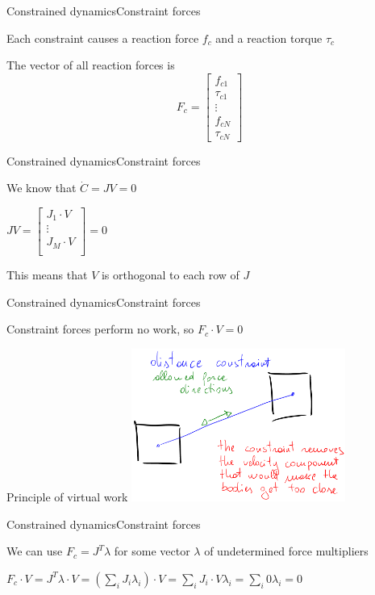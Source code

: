 \documentclass{beamer}
\begin{document}
\begin{slide}{Constrained dynamics}{Constraint forces}{
\item Each constraint causes a reaction force $f_c$ and a reaction torque $\tau_c$
\item The vector of all reaction forces is $$F_c = \left[ \begin{matrix}
f_{c1} \\ \tau_{c1} \\ \vdots \\ f_{cN} \\ \tau_{cN}
\end{matrix} \right]$$
}\end{slide}

\begin{slide}{Constrained dynamics}{Constraint forces}{
\item We know that $\dot C = J V = 0$
\item $J V = \left[ \begin{matrix}
J_1 \cdot V \\ \vdots \\ J_M \cdot V \\
\end{matrix} \right] = 0$
\item This means that $V$ is orthogonal to each row of $J$
}\end{slide}

\begin{slide}{Constrained dynamics}{Constraint forces}{
\item Constraint forces perform no work, so $F_c \cdot V = 0$
}\end{slide}

\begin{frame}{Principle of virtual work}
\center
\includegraphics[width=7cm]{Pics/VirtualWork.png}
\end{frame}

\begin{slide}{Constrained dynamics}{Constraint forces}{
\item We can use $F_c = J^T \lambda$ for some vector $\lambda$ of undetermined force multipliers
\item $F_c \cdot V = J^T \lambda \cdot V = (\sum_i J_i \lambda_i) \cdot V = \sum_i J_i \cdot V \lambda_i = \sum_i 0 \lambda_i = 0$
}\end{slide}
\end{document}

